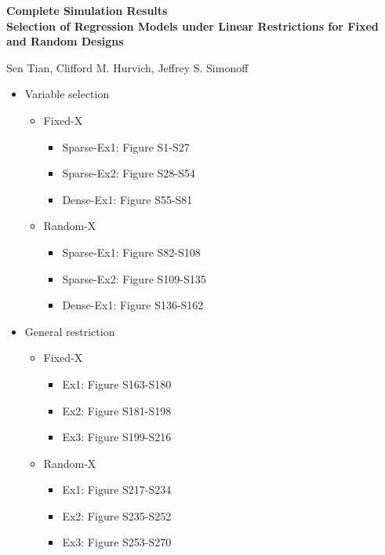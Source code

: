 \documentclass{article}
\newcommand{\beginsupplement}{%
        \setcounter{table}{0}
        \renewcommand{\thetable}{S\arabic{table}}%
        \setcounter{figure}{0}
        \renewcommand{\thefigure}{S\arabic{figure}}%
        \setcounter{page}{0}
        \renewcommand{\theequation}{S.\arabic{equation}}%
        \setcounter{equation}{0}
     }
\begin{document}
\def\spacingset#1{\renewcommand{\baselinestretch}%
{#1}\small\normalsize} \spacingset{1}


\beginsupplement
\appendix
{}
\begin{center}
\textbf{\large Complete Simulation Results \\
Selection of Regression Models under Linear Restrictions for Fixed and Random Designs}

Sen Tian, Clifford M. Hurvich, Jeffrey S. Simonoff
\end{center}

\begin{itemize}
      \item Variable selection
      \begin{itemize}
            \item Fixed-X
            \begin{itemize}
                  \item Sparse-Ex1: Figure S1-S27
                  \item Sparse-Ex2: Figure S28-S54
                  \item Dense-Ex1: Figure S55-S81
            \end{itemize}
            \item Random-X
            \begin{itemize}
                  \item Sparse-Ex1: Figure S82-S108
                  \item Sparse-Ex2: Figure S109-S135
                  \item Dense-Ex1: Figure S136-S162
            \end{itemize}
      \end{itemize}
      \item General restriction
      \begin{itemize}
            \item Fixed-X
            \begin{itemize}
                  \item Ex1: Figure S163-S180
                  \item Ex2: Figure S181-S198
                  \item Ex3: Figure S199-S216
            \end{itemize}
            \item Random-X
            \begin{itemize}
                  \item Ex1: Figure S217-S234
                  \item Ex2: Figure S235-S252
                  \item Ex3: Figure S253-S270
            \end{itemize}
      \end{itemize}
\end{itemize}



\end{document}

